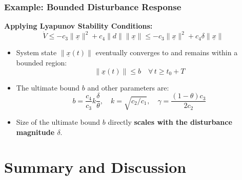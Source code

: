 \documentclass[student, noshadow, lsr, english, aspectratio=169, t]{ITR_LSR_slides}
\begin{document}
\begin{frame}
    \frametitle{Example: Bounded Disturbance Response}

    \textbf{Applying Lyapunov Stability Conditions:}
		\[ \dot{V} \leq -c_3 \|\underline{x}\|^2 + c_4 \|d\| \|\underline{x}\| \leq -c_3 \|\underline{x}\|^2 + c_4 \delta \|\underline{x}\| \]


    \vspace{-0.1cm}
    \begin{tcolorbox}[title=Conclusion: Ultimate Boundedness Guaranteed]
        \begin{itemize}
            \item System state $\|\underline{x}(t)\|$ eventually converges to and remains within a bounded region:
                  \[ \|\underline{x}(t)\| \leq b \quad \forall\, t \geq t_0 + T \]
            \item The ultimate bound $b$ and other parameters are:
                  \[ b = \frac{c_4}{c_3} k \frac{\delta}{\theta}, \quad k = \sqrt{c_2/c_1}, \quad \gamma = \frac{(1 - \theta)c_3}{2c_2} \]
            \item Size of the ultimate bound $b$ directly \textbf{scales with the disturbance magnitude $\delta$}.
        \end{itemize}
    \end{tcolorbox}
\end{frame}


\section{Summary and Discussion}
\end{document}
